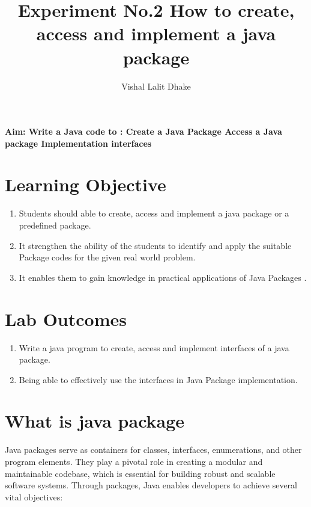 \documentclass{article}
\date{}
\author{Vishal Lalit Dhake}
\title{Experiment No.2 How to create, access and implement a java package  }
\begin{document}
\title{\fontsize{16pt}{20pt}
\author{\textbf{\textrm{}}}}

\maketitle
{}

\textbf{\fontsize{12}{20}\textrm{{ {Aim: Write a Java code to : Create a Java Package
Access a Java package
Implementation interfaces
}}}}



\section*{Learning Objective}

\begin{enumerate}
\item  Students should able to create, access and implement a java package or a predefined package.
\item It strengthen the ability of the students to identify and apply the suitable Package codes for the given real world problem. 
\item It enables them to gain knowledge in practical applications of Java Packages .
\end{enumerate}





\section*{Lab Outcomes}

\begin{enumerate}
\item Write a java program to create, access and implement interfaces of a java package.
\item Being able to effectively use the interfaces in Java Package implementation.
\end{enumerate}



\section*{What is java package}
Java packages serve as containers for classes, interfaces, enumerations, and other program elements. They play a pivotal role in creating a modular and maintainable codebase, which is essential for building robust and scalable software systems. Through packages, Java enables developers to achieve several vital objectives:
\end{document}
